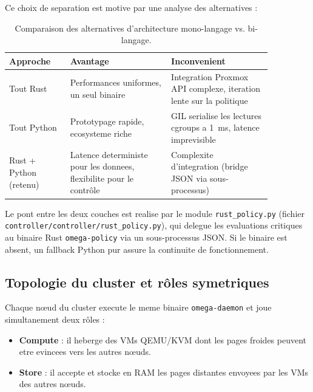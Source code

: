 Ce choix de separation est motive par une analyse des alternatives :

\begin{table}[htbp]
    \centering
    \caption{Comparaison des alternatives d'architecture mono-langage vs. bi-langage.}
    \label{tab:choix-langage}
    \begin{tabular}{p{0.20\linewidth} p{0.33\linewidth} p{0.33\linewidth}}
        \toprule
        \textbf{Approche} & \textbf{Avantage} & \textbf{Inconvenient} \\
        \midrule
        Tout Rust & Performances uniformes, un seul binaire & Integration Proxmox API complexe, iteration lente sur la politique \\
        Tout Python & Prototypage rapide, ecosysteme riche & GIL serialise les lectures cgroups a 1~ms, latence imprevisible \\
        Rust + Python (retenu) & Latence deterministe pour les donnees, flexibilite pour le contr\^ole & Complexite d'integration (bridge JSON via sous-processus) \\
        \bottomrule
    \end{tabular}
\end{table}

Le pont entre les deux couches est realise par le module \texttt{rust\_policy.py} (fichier \texttt{controller/controller/rust\_policy.py}), qui delegue les evaluations critiques au binaire Rust \texttt{omega-policy} via un sous-processus JSON. Si le binaire est absent, un fallback Python pur assure la continuite de fonctionnement.

\subsection{Topologie du cluster et r\^oles symetriques}
\label{subsec:topologie-cluster}

Chaque n\oe{}ud du cluster execute le meme binaire \texttt{omega-daemon} et joue simultanement deux r\^oles :

\begin{itemize}
    \item \textbf{Compute} : il heberge des VMs QEMU/KVM dont les pages froides peuvent etre evincees vers les autres n\oe{}uds.
    \item \textbf{Store} : il accepte et stocke en RAM les pages distantes envoyees par les VMs des autres n\oe{}uds.
\end{itemize}

